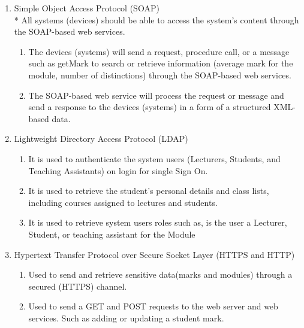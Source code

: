 \documentclass[12pt]{article}
\begin{document}
			\begin{enumerate}
	                    \item Simple Object Access Protocol (SOAP) \\*
	                    All systems (devices) should be able to access the system’s content through the SOAP-based web services. 
	                        \begin{enumerate}
	                            \item The devices (systems) will send a request, procedure call, or a message such as getMark to search or retrieve information (average mark for the module, number of distinctions) through the SOAP-based web services.
	                            \item The SOAP-based web service will process the request or message and send a response to the devices (systems) in a form of a structured XML-based data.
	                        \end{enumerate}
	                    \item Lightweight Directory Access Protocol (LDAP)
	                        \begin{enumerate}
	                            \item It is used to authenticate the system users (Lecturers, Students, and Teaching Assistants) on login for single Sign On.
	                            \item It is used to retrieve the student’s personal details and class lists, including courses assigned to lectures and students.
	                            \item It is used to retrieve system users roles such as, is the user a Lecturer, Student, or teaching assistant for the Module
	                        \end{enumerate}
	                    \item  Hypertext Transfer Protocol over Secure Socket Layer (HTTPS and HTTP)
	                        \begin{enumerate}
	                            \item Used to send and retrieve sensitive data(marks and modules) through a secured (HTTPS) channel.
	                            \item Used to send a GET and POST requests to the web server and web services. Such as adding or updating a student mark.
	                        \end{enumerate}
	                        
              		\end{enumerate}
			\vspace{0.2in}
			
\end{document}
